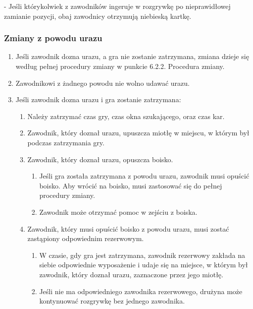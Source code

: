\documentclass[12pt]{article}
\newcommand\other{\bgroup\color{green}\markoverwith{\textcolor{green}{\rule[-0.5ex]{2pt}{0.4pt}}}\ULon}
\begin{document}
\other{Podwójna niebieska kartka} - Jeśli którykolwiek z zawodników
ingeruje w rozgrywkę po nieprawidłowej zamianie pozycji, obaj zawodnicy
otrzymują niebieską kartkę.

\subsubsection{Zmiany z powodu urazu}

\begin{enumerate}
	\item
	      Jeśli zawodnik dozna urazu, a gra nie zostanie zatrzymana, zmiana
	      dzieje się według pełnej procedury zmiany w punkcie 6.2.2. Procedura
	      zmiany.
	\item
	      Zawodnikowi z żadnego powodu nie wolno udawać urazu.
	\item
	      Jeśli zawodnik dozna urazu i gra zostanie zatrzymana:

	      \begin{enumerate}
		      \item
		            Należy zatrzymać czas gry, czas okna szukającego, oraz czas kar.
		      \item
		            Zawodnik, który doznał urazu, upuszcza miotłę w miejscu, w którym
		            był podczas zatrzymania gry.
		      \item
		            Zawodnik, który doznał urazu, opuszcza boisko.

		            \begin{enumerate}
			            \item
			                  Jeśli gra została zatrzymana z powodu urazu, zawodnik musi opuścić
			                  boisko. Aby wrócić na boisko, musi zastosować się do pełnej
			                  procedury zmiany.
			            \item
			                  Zawodnik może otrzymać pomoc w zejściu z boiska.
		            \end{enumerate}
		      \item
		            Zawodnik, który musi opuścić boisko z powodu urazu, musi zostać
		            zastąpiony odpowiednim rezerwowym.

		            \begin{enumerate}
			            \item
			                  W czasie, gdy gra jest zatrzymana, zawodnik rezerwowy zakłada na
			                  siebie odpowiednie wyposażenie i udaje się na miejsce, w którym
			                  był zawodnik, który doznał urazu, zaznaczone przez jego miotłę.
			            \item
			                  Jeśli nie ma odpowiedniego zawodnika rezerwowego, drużyna może
			                  kontynuować rozgrywkę bez jednego zawodnika.
		            \end{enumerate}
	      \end{enumerate}
\end{enumerate}
\end{document}

